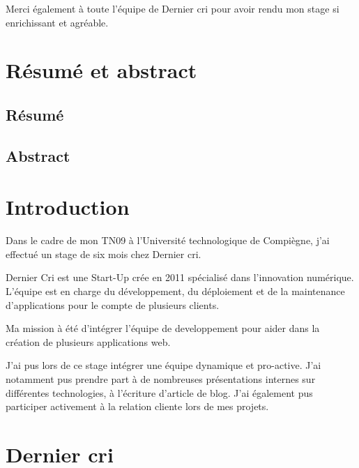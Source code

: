 \documentclass[12pt,a4paper]{article}
\begin{document}
  \bigskip

  Merci également à toute l'équipe de Dernier cri pour avoir rendu mon
  stage si enrichissant et agréable.

  \newpage

  \section{Résumé et abstract}\label{ruxe9sumuxe9-et-abstract}

  \bigskip

  \subsection{Résumé}\label{ruxe9sumuxe9}

  \newpage

  \subsection{Abstract}\label{abstract}

  \newpage

  \section{Introduction}\label{introduction}

  \bigskip

  Dans le cadre de mon TN09 à l'Université technologique de Compiègne,
  j'ai effectué un stage de six mois chez Dernier cri.

  \bigskip

  Dernier Cri est une Start-Up crée en 2011 spécialisé dans l'innovation
  numérique. L'équipe est en charge du développement, du déploiement et de
  la maintenance d'applications pour le compte de plusieurs clients.

  \bigskip

  Ma mission à été d'intégrer l'équipe de developpement pour aider dans la
  création de plusieurs applications web.

  \bigskip

  J'ai pus lors de ce stage intégrer une équipe dynamique et pro-active.
  J'ai notamment pus prendre part à de nombreuses présentations internes
  sur différentes technologies, à l'écriture d'article de blog. J'ai
  également pus participer activement à la relation cliente lors de mes
  projets.

  \newpage

  \section{Dernier cri}\label{dernier-cri}
\end{document}
